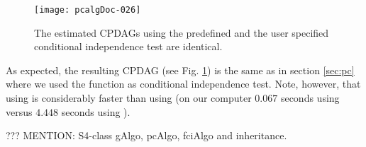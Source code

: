 \documentclass[article]{jss}
\begin{document}
\begin{figure}
  \begin{center}
\texttt{[image: pcalgDoc-026]}
\caption{The estimated CPDAGs using the predefined and the user specified
  conditional independence test are identical.}
\label{fig:userSpec}
\end{center}
\end{figure}
As expected, the resulting CPDAG (see Fig. \ref{fig:userSpec}) is the same
as in section \ref{sec:pc} where we used the function  as
conditional independence test. Note, however, that using
 is considerably faster than using  (on
our computer $0.067$ seconds using  versus $4.448$
seconds using ).

??? MENTION: S4-class gAlgo, pcAlgo, fciAlgo and inheritance.

\end{document}
